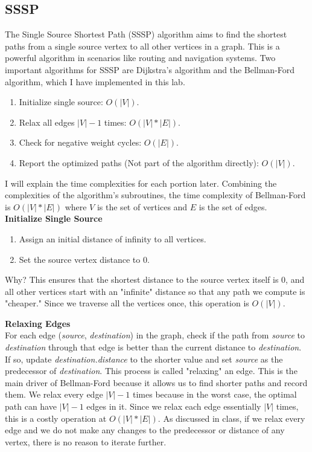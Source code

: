 \documentclass[letterpaper, 10pt]{article}
\begin{document}
\subsection{SSSP}
The Single Source Shortest Path (SSSP) algorithm aims to find the shortest paths from a single source vertex to all other vertices in a graph. This is a powerful algorithm in scenarios like routing and navigation systems. Two important algorithms for SSSP are Dijkstra's algorithm and the Bellman-Ford algorithm, which I have implemented in this lab.
\begin{enumerate}
    \item Initialize single source: $O(|V|)$.
    \item Relax all edges $|V| - 1$ times: $O(|V| * |E|)$.
    \item Check for negative weight cycles: $O(|E|)$.
    \item Report the optimized paths (Not part of the algorithm directly): $O(|V|)$.
\end{enumerate}
I will explain the time complexities for each portion later. Combining the complexities of the algorithm's subroutines, the time complexity of Bellman-Ford is $O(|V| * |E|)$ where $V$ is the set of vertices and $E$ is the set of edges. \\
\noindent \newline
\textbf{Initialize Single Source}
\begin{enumerate}
    \item Assign an initial distance of infinity to all vertices.
    \item Set the source vertex distance to 0.

\end{enumerate}
Why? This ensures that the shortest distance to the source vertex itself is 0, and all other vertices start with an "infinite" distance so that any path we compute is "cheaper." Since we traverse all the vertices once, this operation is $O(|V|)$.

\newpage
\noindent
\textbf{Relaxing Edges} \\
\indent For each edge (\textit{source}, \textit{destination}) in the graph, check if the path from \textit{source} to \textit{destination} through that edge is better than the current distance to \textit{destination}. If so, update \textit{destination.distance} to the shorter value and set \textit{source} as the predecessor of \textit{destination}. \newline
This process is called "relaxing" an edge. This is the main driver of Bellman-Ford because it allows us to find shorter paths and record them. We relax every edge $|V| - 1$ times because in the worst case, the optimal path can have $|V| - 1$ edges in it. Since we relax each edge essentially $|V|$ times, this is a costly operation at $O(|V| * |E|)$. As discussed in class, if we relax every edge and we do not make any changes to the predecessor or distance of any vertex, there is no reason to iterate further. 


\end{document}
